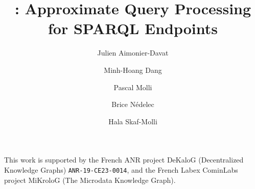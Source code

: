 \documentclass{ceurart}
\title{\NAME: Approximate Query Processing\\for SPARQL Endpoints}
\author[1]{Julien Aimonier-Davat}[%
  orcid=0000-0001-6707-0204,
  email=julien.aimonier-davat@univ-nantes.fr,
]
\author[1]{Minh-Hoang Dang}[%
  email=minh-hoang.dang@univ-nantes.fr,
]
\author[1]{Pascal Molli}[%
  orcid=0000-0001-8048-273X,
  email=pascal.molli@univ-nantes.fr,
]
\author[1]{Brice N{\'e}delec}[%
  email=brice.nedelec@univ-nantes.fr,
]
\author[1]{Hala Skaf-Molli}[%
  orcid=0000-0003-1062-6659,
  email=hala.skaf@univ-nantes.fr,
]
\begin{document}


\maketitle






\begin{acknowledgments}
  This work is supported by the French ANR project DeKaloG
  (Decentralized Knowledge Graphs) \texttt{ANR-19-CE23-0014}, and the
  French Labex CominLabs project MiKroloG (The Microdata Knowledge
  Graph).
\end{acknowledgments}


\end{document}
